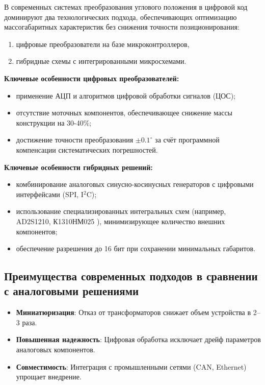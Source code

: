 В современных системах преобразования углового положения в цифровой код доминируют два технологических подхода, обеспечивающих оптимизацию массогабаритных характеристик без снижения точности позиционирования:
\begin{enumerate}
    \item цифровые преобразователи на базе микроконтроллеров,
    \item гибридные схемы с интегрированными микросхемами.
\end{enumerate}

\textbf{Ключевые особенности цифровых преобразователей:}
\begin{itemize}
    \item применение АЦП и алгоритмов цифровой обработки сигналов (ЦОС);
    \item отсутствие моточных компонентов, обеспечивающее снижение массы конструкции на 30-40\%;
    \item достижение точности преобразования $\pm 0.1^\circ$ за счёт программной компенсации систематических погрешностей.
\end{itemize}

\textbf{Ключевые особенности гибридных решений:}
\begin{itemize}
    \item комбинирование аналоговых синусно-косинусных генераторов с цифровыми интерфейсами (SPI, I$^2$C);
    \item использование специализированных интегральных схем (например, AD2S1210, К1310НМ025 \cite{Spec}), минимизирующее количество внешних компонентов;
    \item обеспечение разрешения до 16 бит при сохранении минимальных габаритов.
\end{itemize}

\subsection{Преимущества современных подходов в сравнении с аналоговыми решениями}
\begin{itemize}
    \item \textbf{Миниатюризация}: Отказ от трансформаторов снижает объем устройства в 2–3 раза.
    \item \textbf{Повышенная надежность}: Цифровая обработка исключает дрейф параметров аналоговых компонентов.
    \item \textbf{Совместимость}: Интеграция с промышленными сетями (CAN, Ethernet) упрощает внедрение.
\end{itemize}

